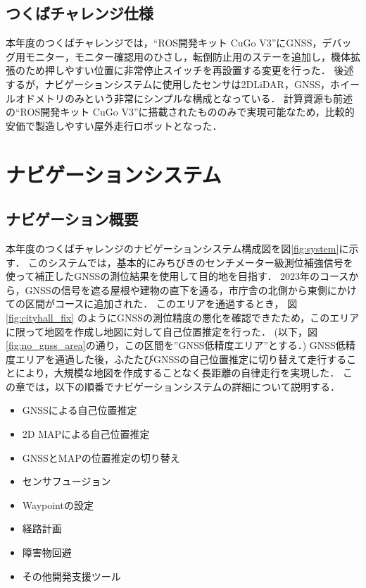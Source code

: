 \documentclass[platex,dvipdfmx]{rbproceedings}
\begin{document}
\subsection{つくばチャレンジ仕様}
本年度のつくばチャレンジでは，“ROS開発キット CuGo V3”にGNSS，デバッグ用モニター，モニター確認用のひさし，転倒防止用のステーを追加し，機体拡張のため押しやすい位置に非常停止スイッチを再設置する変更を行った．
後述するが，ナビゲーションシステムに使用したセンサは2DLiDAR，GNSS，ホイールオドメトリのみという非常にシンプルな構成となっている．
計算資源も前述の“ROS開発キット CuGo V3”に搭載されたもののみで実現可能なため，比較的安価で製造しやすい屋外走行ロボットとなった．

\section{ナビゲーションシステム}
\subsection{ナビゲーション概要}
本年度のつくばチャレンジのナビゲーションシステム構成図を図\ref{fig:system}に示す．
このシステムでは，基本的にみちびきのセンチメーター級測位補強信号を使って補正したGNSSの測位結果を使用して目的地を目指す．
2023年のコースから，GNSSの信号を遮る屋根や建物の直下を通る，市庁舎の北側から東側にかけての区間がコースに追加された．
このエリアを通過するとき， 図\ref{fig:cityhall_fix} のようにGNSSの測位精度の悪化を確認できたため，このエリアに限って地図を作成し地図に対して自己位置推定を行った．
(以下，図\ref{fig:no_gnss_area}の通り，この区間を”GNSS低精度エリア”とする．)
GNSS低精度エリアを通過した後，ふたたびGNSSの自己位置推定に切り替えて走行することにより，大規模な地図を作成することなく長距離の自律走行を実現した．
この章では，以下の順番でナビゲーションシステムの詳細について説明する．

\begin{itemize}
    \item GNSSによる自己位置推定
    \item 2D MAPによる自己位置推定
    \item GNSSとMAPの位置推定の切り替え
    \item センサフュージョン
    \item Waypointの設定
    \item 経路計画
    \item 障害物回避
    \item その他開発支援ツール
\end{itemize}
\end{document}
